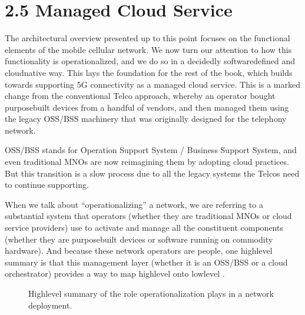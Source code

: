\documentclass[a4paper,11pt,english]{sphinxmanual}
\let\sphinxpxdimen\pdfpxdimen\else\newdimen\sphinxpxdimen
\begin{document}
\section{2.5 Managed Cloud Service}
\label{\detokenize{arch:managed-cloud-service}}
\sphinxAtStartPar
The architectural overview presented up to this point focuses on the
functional elements of the mobile cellular network. We now turn our
attention to how this functionality is operationalized, and we do so
in a decidedly software\sphinxhyphen{}defined and cloud\sphinxhyphen{}native way. This lays the
foundation for the rest of the book, which builds towards supporting
5G connectivity as a managed cloud service. This is a marked change
from the conventional Telco approach, whereby an operator bought
purpose\sphinxhyphen{}built devices from a handful of vendors, and then managed them
using the legacy OSS/BSS machinery that was originally designed for
the telephony network.%
\begin{footnote}[1]\sphinxAtStartFootnote
OSS/BSS stands for Operation Support System / Business Support
System, and even traditional MNOs are now re\sphinxhyphen{}imagining them by
adopting cloud practices. But this transition is a slow process
due to all the legacy systems the Telcos need to continue
supporting.
%
\end{footnote}

\sphinxAtStartPar
When we talk about “operationalizing” a network, we are referring to a
substantial system that operators (whether they are traditional MNOs
or cloud service providers) use to activate and manage all the
constituent components (whether they are purpose\sphinxhyphen{}built devices or
software running on commodity hardware). And because these network
operators are people, one high\sphinxhyphen{}level summary is that this management
layer (whether it is an OSS/BSS or a cloud orchestrator) provides a
way to map high\sphinxhyphen{}level  onto low\sphinxhyphen{}level .

\begin{figure}[ht]
\centering
\capstart

\noindent\sphinxincludegraphics[width=300\sphinxpxdimen]{{Slide21}.png}
\caption{High\sphinxhyphen{}level summary of the role operationalization plays in a
network deployment.}\label{\detokenize{arch:id15}}\label{\detokenize{arch:fig-intent}}\end{figure}
\end{document}
